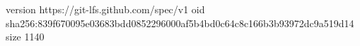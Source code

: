 version https://git-lfs.github.com/spec/v1
oid sha256:839f670095e03683bdd0852296000af5b4bd0c64c8c166b3b93972dc9a519d14
size 1140
